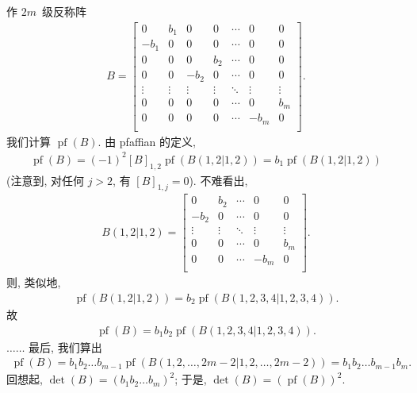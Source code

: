 \begin{example}
    作 \(2m\)~级反称阵
    \begin{align*}
        B =
        \begin{bmatrix}
            0      & b_1    & 0      & 0      & \cdots & 0      & 0      \\
            -b_1   & 0      & 0      & 0      & \cdots & 0      & 0      \\
            0      & 0      & 0      & b_2    & \cdots & 0      & 0      \\
            0      & 0      & -b_2   & 0      & \cdots & 0      & 0      \\
            \vdots & \vdots & \vdots & \vdots & \ddots & \vdots & \vdots \\
            0      & 0      & 0      & 0      & \cdots & 0      & b_m    \\
            0      & 0      & 0      & 0      & \cdots & -b_m   & 0      \\
        \end{bmatrix}.
    \end{align*}
    我们计算 \(\operatorname{pf} (B)\).
    由 pfaffian 的定义,
    \begin{align*}
        \operatorname{pf} {(B)}
        = (-1)^2 [B]_{1,2} \operatorname{pf} {(B({1,2}|{1,2}))}
        = b_1 \operatorname{pf} {(B({1,2}|{1,2}))}
    \end{align*}
    (注意到, 对任何 \(j > 2\), 有 \([B]_{1,j} = 0\)).
    不难看出,
    \begin{align*}
        B({1,2}|{1,2}) =
        \begin{bmatrix}
            0      & b_2    & \cdots & 0      & 0      \\
            -b_2   & 0      & \cdots & 0      & 0      \\
            \vdots & \vdots & \ddots & \vdots & \vdots \\
            0      & 0      & \cdots & 0      & b_m    \\
            0      & 0      & \cdots & -b_m   & 0      \\
        \end{bmatrix}.
    \end{align*}
    则, 类似地,
    \begin{align*}
        \operatorname{pf} {(B({1,2}|{1,2}))}
        = b_2 \operatorname{pf} {(B({1,2,3,4}|{1,2,3,4}))}.
    \end{align*}
    故
    \begin{align*}
        \operatorname{pf} {(B)}
        = b_1 b_2 \operatorname{pf} {(B({1,2,3,4}|{1,2,3,4}))}.
    \end{align*}
    \(\dots \dots\)
    最后, 我们算出
    \begin{align*}
        \operatorname{pf} {(B)}
        = b_1 b_2 \dots b_{m-1}
        \operatorname{pf} {(
        B({1,2,\dots,2m-2}|{1,2,\dots,2m-2})
        )}
        = b_1 b_2 \dots b_{m-1} b_m.
    \end{align*}
    回想起, \(\det {(B)} = (b_1 b_2 \dots b_m)^2\);
    于是, \(\det {(B)} = (\operatorname{pf} {(B)})^2\).
\end{example}

